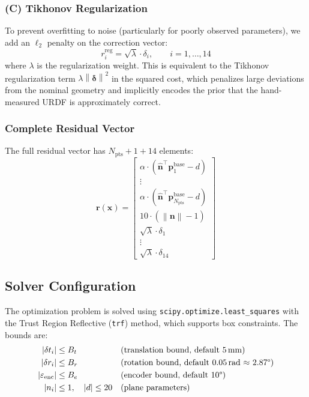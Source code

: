 \documentclass[12pt,a4paper]{article}
\newcommand{\nh}{\hat{\mathbf{n}}}
\newcommand{\nraw}{\mathbf{n}}
\newcommand{\pvec}{\mathbf{p}}
\newcommand{\norm}[1]{\left\|#1\right\|}
\newcommand{\code}[1]{\texttt{#1}}
\begin{document}
\subsubsection{(C) Tikhonov Regularization}

To prevent overfitting to noise (particularly for poorly observed
parameters), we add an $\ell_2$ penalty on the correction vector:
\begin{equation}
    r_i^{\text{reg}} = \sqrt{\lambda} \cdot \delta_i, \qquad i = 1, \ldots, 14
    \label{eq:regularization}
\end{equation}
where $\lambda$ is the regularization weight. This is equivalent to the
Tikhonov regularization term $\lambda \norm{\bm{\delta}}^2$ in the
squared cost, which penalizes large deviations from the nominal geometry
and implicitly encodes the prior that the hand-measured URDF is
approximately correct.

\subsubsection{Complete Residual Vector}

The full residual vector has $N_{\text{pts}} + 1 + 14$ elements:
\begin{equation}
    \mathbf{r}(\mathbf{x}) =
    \begin{bmatrix}
        \alpha \cdot (\nh^\top \pvec_1^{\text{base}} - d) \\
        \vdots \\
        \alpha \cdot (\nh^\top \pvec_{N_{\text{pts}}}^{\text{base}} - d) \\
        10 \cdot (\norm{\nraw} - 1) \\
        \sqrt{\lambda} \cdot \delta_1 \\
        \vdots \\
        \sqrt{\lambda} \cdot \delta_{14}
    \end{bmatrix}
    \label{eq:full_residuals}
\end{equation}

\subsection{Solver Configuration}

The optimization problem is solved using \code{scipy.optimize.least\_squares}
with the Trust Region Reflective (\code{trf}) method, which supports
box constraints. The bounds are:
\begin{equation}
    \begin{aligned}
        |\delta t_i| &\le B_t  &&\text{(translation bound, default 5\,mm)} \\
        |\delta r_i| &\le B_r  &&\text{(rotation bound, default 0.05\,rad $\approx$ 2.87\textdegree)} \\
        |\varepsilon_{\text{enc}}| &\le B_e  &&\text{(encoder bound, default 10\textdegree)} \\
        |n_i| &\le 1,\quad |d| \le 20  &&\text{(plane parameters)}
    \end{aligned}
    \label{eq:bounds}
\end{equation}
\end{document}
